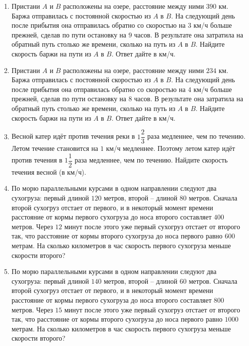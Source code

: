 \documentclass[12pt, a4paper]{article}
\begin{document}
\begin{enumerate}
		\item Пристани \( A  \) и \( B  \) расположены на озере, расстояние между ними \( 390  \) км. Баржа отправилась с постоянной скоростью из \( A  \) в \( B \). На следующий день после прибытия она отправилась обратно со скоростью на \( 3  \) км/ч больше прежней, сделав по пути остановку на \( 9  \) часов. В результате она затратила на обратный путь столько же времени, сколько на путь из \( A  \) в \( B \). Найдите скорость баржи на пути из \( A  \) в \( B \). Ответ дайте в км/ч.
		\item Пристани \( A  \) и \( B  \) расположены на озере, расстояние между ними \(234\) км. Баржа отправилась с постоянной скоростью из \( A  \) в \( B \). На следующий день после прибытия она отправилась обратно со скоростью на \(4\) км/ч больше прежней, сделав по пути остановку на \(8\) часов. В результате она затратила на обратный путь столько же времени, сколько на путь из \(A\) в \(B\). Найдите скорость баржи на пути из \(A\)  в \(B\). Ответ дайте в км/ч.
		\item Весной катер идёт против течения реки в \( 1\dfrac{2}{3} \) раза медленнее, чем по течению. Летом течение становится на \( 1  \) км/ч медленнее. Поэтому летом катер идёт против течения в \( 1\dfrac{1}{2} \) раза медленнее, чем по течению. Найдите скорость течения весной (в км/ч).
		\item По морю параллельными курсами в одном направлении следуют два сухогруза: первый длиной \(120\) метров, второй – длиной \(80\) метров. Сначала второй сухогруз отстает от первого, и в некоторый момент времени расстояние от кормы первого сухогруза до носа второго составляет \(400  \) метров. Через \(12\) минут после этого уже первый сухогруз отстает от второго так, что расстояние от кормы второго сухогруза до носа первого равно \( 600  \) метрам. На сколько километров в час скорость первого сухогруза меньше скорости второго?
		\item По морю параллельными курсами в одном направлении следуют два сухогруза: первый длиной \(140\) метров, второй – длиной \( 60  \) метров. Сначала второй сухогруз отстает от первого, и в некоторый момент времени расстояние от кормы первого сухогруза до носа второго составляет \( 800  \) метров. Через \( 15  \) минут после этого уже первый сухогруз отстает от второго так, что расстояние от кормы второго сухогруза до носа первого равно \( 1000  \) метрам. На сколько километров в час скорость первого сухогруза меньше скорости второго?
	\end{enumerate}	
	
\end{document}
